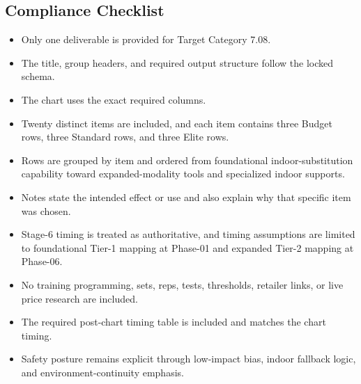 \documentclass[10pt]{article}
\begin{document}
\clearpage

\subsection*{Compliance Checklist}
{}

\begin{itemize}
\item Only one deliverable is provided for Target Category 7.08.
\item The title, group headers, and required output structure follow the locked schema.
\item The chart uses the exact required columns.
\item Twenty distinct items are included, and each item contains three Budget rows, three Standard rows, and three Elite rows.
\item Rows are grouped by item and ordered from foundational indoor-substitution capability toward expanded-modality tools and specialized indoor supports.
\item Notes state the intended effect or use and also explain why that specific item was chosen.
\item Stage-6 timing is treated as authoritative, and timing assumptions are limited to foundational Tier-1 mapping at Phase-01 and expanded Tier-2 mapping at Phase-06.
\item No training programming, sets, reps, tests, thresholds, retailer links, or live price research are included.
\item The required post-chart timing table is included and matches the chart timing.
\item Safety posture remains explicit through low-impact bias, indoor fallback logic, and environment-continuity emphasis.
\end{itemize}
\end{document}
